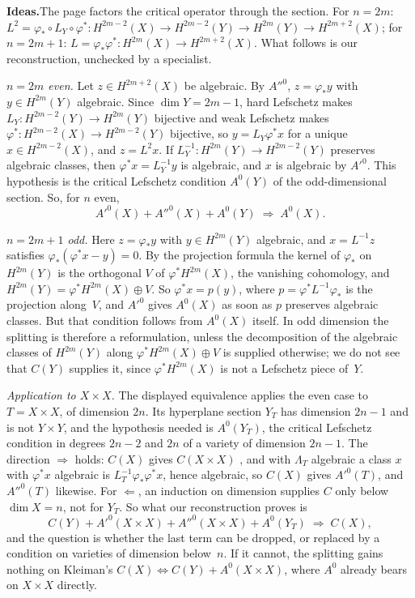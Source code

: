 \documentclass[11pt]{article}
\theoremstyle{definition}
\theoremstyle{plain}\newtheorem*{proposition}{Proposition}\theoremstyle{definition}
\newcommand{\entry}[1]{\par\medskip\noindent\textbf{#1}\enspace}
\newcommand{\ideas}{\entry{Ideas.}}
\begin{document}
\ideas The page factors the critical operator through the section. For $n = 2m$: $L^2 = \varphi_* \circ L_Y \circ \varphi^* : H^{2m-2}(X) \to H^{2m-2}(Y) \to H^{2m}(Y) \to H^{2m+2}(X)$; for $n = 2m+1$: $L = \varphi_*\varphi^* : H^{2m}(X) \to H^{2m+2}(X)$. What follows is our reconstruction, unchecked by a specialist.

\emph{$n = 2m$ even.} Let $z \in H^{2m+2}(X)$ be algebraic. By $A''^{0}$, $z = \varphi_*y$ with $y \in H^{2m}(Y)$ algebraic. Since $\dim Y = 2m-1$, hard Lefschetz makes $L_Y : H^{2m-2}(Y) \to H^{2m}(Y)$ bijective and weak Lefschetz makes $\varphi^* : H^{2m-2}(X) \to H^{2m-2}(Y)$ bijective, so $y = L_Y\varphi^*x$ for a unique $x \in H^{2m-2}(X)$, and $z = L^2x$. If $L_Y^{-1} : H^{2m}(Y) \to H^{2m-2}(Y)$ preserves algebraic classes, then $\varphi^*x = L_Y^{-1}y$ is algebraic, and $x$ is algebraic by $A'^{0}$. This hypothesis is the critical Lefschetz condition $A^0(Y)$ of the odd-dimensional section. So, for $n$ even,
\[
A'^{0}(X) + A''^{0}(X) + A^0(Y) \;\Longrightarrow\; A^0(X).
\]

\emph{$n = 2m+1$ odd.} Here $z = \varphi_*y$ with $y \in H^{2m}(Y)$ algebraic, and $x = L^{-1}z$ satisfies $\varphi_*(\varphi^*x - y) = 0$. By the projection formula the kernel of $\varphi_*$ on $H^{2m}(Y)$ is the orthogonal $V$ of $\varphi^*H^{2m}(X)$, the vanishing cohomology, and $H^{2m}(Y) = \varphi^*H^{2m}(X) \oplus V$. So $\varphi^*x = p(y)$, where $p = \varphi^* L^{-1} \varphi_*$ is the projection along~$V$, and $A'^{0}$ gives $A^0(X)$ as soon as $p$ preserves algebraic classes. But that condition follows from $A^0(X)$ itself. In odd dimension the splitting is therefore a reformulation, unless the decomposition of the algebraic classes of $H^{2m}(Y)$ along $\varphi^*H^{2m}(X) \oplus V$ is supplied otherwise; we do not see that $C(Y)$ supplies it, since $\varphi^*H^{2m}(X)$ is not a Lefschetz piece of~$Y$.

\emph{Application to $X \times X$.} The displayed equivalence applies the even case to $T = X \times X$, of dimension $2n$. Its hyperplane section $Y_T$ has dimension $2n-1$ and is not $Y \times Y$, and the hypothesis needed is $A^0(Y_T)$, the critical Lefschetz condition in degrees $2n-2$ and $2n$ of a variety of dimension $2n-1$. The direction $\Rightarrow$ holds: $C(X)$ gives $C(X \times X)$ \cite{kleiman1968}, and with $\Lambda_T$ algebraic a class $x$ with $\varphi^*x$ algebraic is $L_T^{-1}\varphi_*\varphi^*x$, hence algebraic, so $C(X)$ gives $A'^{0}(T)$, and $A''^{0}(T)$ likewise. For $\Leftarrow$, an induction on dimension supplies $C$ only below $\dim X = n$, not for $Y_T$. So what our reconstruction proves is
\[
C(Y) + A'^{0}(X \times X) + A''^{0}(X \times X) + A^0(Y_T) \;\Longrightarrow\; C(X),
\]
and the question is whether the last term can be dropped, or replaced by a condition on varieties of dimension below~$n$. If it cannot, the splitting gains nothing on Kleiman's $C(X) \iff C(Y) + A^0(X \times X)$, where $A^0$ already bears on $X \times X$ directly.
\end{document}
